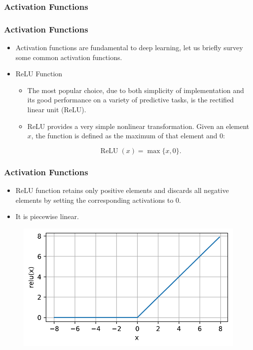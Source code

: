 \documentclass[
  shownotes,
  xcolor={svgnames},
  hyperref={colorlinks,citecolor=DarkBlue,linkcolor=DarkRed,urlcolor=DarkBlue}
  , aspectratio=169]{beamer}
\begin{document}
\subsubsection{Activation Functions}
\begin{frame}
\frametitle{Activation Functions}

\begin{itemize}
\item Activation functions are fundamental to deep learning, let us briefly survey some common activation functions.
\medskip
\item ReLU Function
\begin{itemize}
\item The most popular choice, due to both simplicity of implementation and its good performance on a variety of predictive tasks, is the rectified linear unit (ReLU). 
\medskip
\item ReLU provides a very simple nonlinear transformation. Given an element $x$, the function is defined as the maximum of that element and $0$:

$$\operatorname{ReLU}(x) = \max \{x, 0\}.$$

\end{itemize}
\end{itemize}

\end{frame}
\begin{frame}
\frametitle{Activation Functions}

\begin{itemize}
\item  ReLU function retains only positive elements and discards all negative elements by setting the corresponding activations to 0. 
\item It is piecewise linear.
\end{itemize}



  \begin{figure}[H] \centering
            \captionsetup{justification=centering}
              \includegraphics[scale=0.45]{figures/relu}
              
 \end{figure}

\end{frame}
\end{document}

